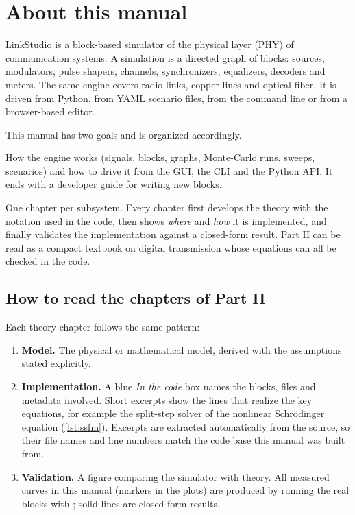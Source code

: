 \chapter{About this manual}

LinkStudio is a block-based simulator of the physical layer (PHY) of communication systems. A
simulation is a directed graph of blocks: sources, modulators, pulse shapers, channels,
synchronizers, equalizers, decoders and meters. The same engine covers radio links,
copper lines and optical fiber. It is driven from Python, from YAML scenario files, from the
command line or from a browser-based editor.

This manual has two goals and is organized accordingly.

\begin{description}[leftmargin=0pt,font=\sffamily\bfseries\color{accent}]
  \item[Part I -- Using and extending LinkStudio.] How the engine works (signals, blocks, graphs,
  Monte-Carlo runs, sweeps, scenarios) and how to drive it from the GUI, the CLI and the
  Python API. It ends with a developer guide for writing new blocks.
  \item[Part II -- Theory and implementation.] One chapter per subsystem. Every chapter first
  develops the theory with the notation used in the code, then shows \emph{where} and
  \emph{how} it is implemented, and finally validates the implementation against a closed-form
  result. Part II can be read as a compact textbook on digital transmission whose equations
  can all be checked in the code.
\end{description}

\section*{How to read the chapters of Part II}
Each theory chapter follows the same pattern:
\begin{enumerate}
  \item \textbf{Model.} The physical or mathematical model, derived with the assumptions stated
  explicitly.
  \item \textbf{Implementation.} A blue \emph{In the code} box names the blocks, files and
  metadata involved. Short excerpts show the lines that realize the key equations, for example
  the split-step solver of the nonlinear Schrödinger equation (\cref{lst:ssfm}). Excerpts are
  extracted automatically from the source, so their file names and line numbers match the code
  base this manual was built from.
  \item \textbf{Validation.} A figure comparing the simulator with theory. All measured curves
  in this manual (markers in the plots) are produced by running the real blocks with
  ; solid lines are closed-form results.
\end{enumerate}

